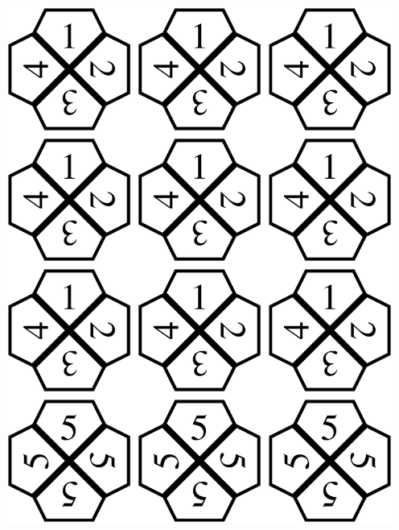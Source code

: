 \documentclass[12pt]{article}
\begin{document}
\begin{center}

~\vfill

\includegraphics[width=5in]{diamondSheet.eps}

\vfill

\newpage

~\vfill


\end{center}
\end{document}
